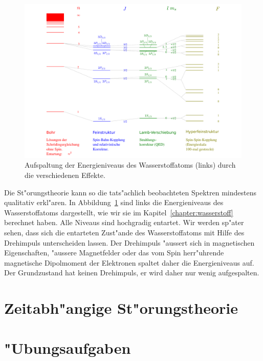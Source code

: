 \begin{figure}
\centering
\includegraphics[width=\hsize]{images/WasserstoffAufspaltung.pdf}
\caption{Aufspaltung der Energieniveaus des Wasserstoffatoms (links)
durch die verschiedenen Effekte.
\label{skript:wasserstoffaufspaltung}}
\end{figure}
Die St"orungstheorie kann so die tats"achlich beobachteten Spektren
mindestens qualitativ erkl"aren.
In Abbildung~\ref{skript:wasserstoffaufspaltung} sind links die Energieniveaus
des Wasserstoffatoms dargestellt, wie wir sie im Kapitel~\ref{chapter:wasserstoff}
berechnet haben.
Alle Niveaus sind hochgradig entartet.
Wir werden sp"ater sehen, dass sich die entarteten Zust"ande des
Wasserstoffatoms mit Hilfe des Drehimpuls unterscheiden lassen.
Der Drehimpuls "aussert sich in magnetischen Eigenschaften,
"aussere Magnetfelder oder das vom Spin herr"uhrende magnetische Dipolmoment
der Elektronen spaltet daher die Energieniveaus auf.
Der Grundzustand hat keinen Drehimpuls, er wird daher nur wenig
aufgespalten.

%
%
\section{Zeitabh"angige St"orungstheorie}

\section*{"Ubungsaufgaben}
\begin{uebungsaufgaben}
\item

\item

\end{uebungsaufgaben}
